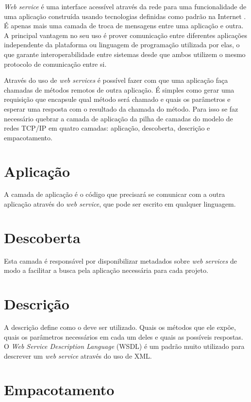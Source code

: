 \label{Cap:web_services}

\textit{Web service} é uma interface acessível através da rede para uma funcionalidade de uma aplicação construída usando tecnologias definidas como padrão na Internet \cite{ref-oreilly-soap}. É apenas mais uma camada de troca de mensagens entre uma aplicação e outra. A principal vantagem no seu uso é prover comunicação entre diferentes aplicações independente da plataforma ou linguagem de programação utilizada por elas, o que garante interoperabilidade entre sistemas desde que ambos utilizem o mesmo protocolo de comunicação entre si.

Através do uso de \textit{web services} é possível fazer com que uma aplicação faça chamadas de métodos remotos de outra aplicação. É simples como gerar uma requisição que encapsule qual método será chamado e quais os parâmetros e esperar uma resposta com o resultado da chamada do método. Para isso se faz necessário quebrar a camada de aplicação da pilha de camadas do modelo de redes TCP/IP em quatro camadas: aplicação, descoberta, descrição e empacotamento.

\section{Aplicação}

A camada de aplicação é o código que precisará se comunicar com a outra aplicação através do \textit{web service}, que pode ser escrito em qualquer linguagem.

\section{Descoberta}

Esta camada é responsável por disponibilizar metadados sobre \textit{web services} de modo a facilitar a busca pela aplicação necessária para cada projeto.

\section{Descrição}

A descrição define como o  deve ser utilizado. Quais os métodos que ele expõe, quais os parâmetros necessários em cada um deles e quais as possíveis respostas. O \textit{Web Service Description Language} (WSDL) é um padrão muito utilizado para descrever um \textit{web service} através do uso de XML.

\section{Empacotamento}




